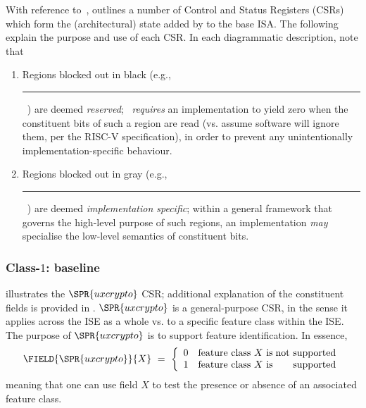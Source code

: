 
With reference to~\cite[Chapter 2]{SCARV:RV:ISA:II},
outlines a number of Control and Status Registers (CSRs) which form the
(architectural) state added by \XCRYPTO to the base ISA.  The following 
\SEC[s] explain the purpose and use of each CSR.
In each diagrammatic description, note that 

\begin{enumerate}
\item Regions blocked out in black 
      (e.g.,~{\color{black}    \rule{3em}{2ex}}~)
      are deemed 
      {\em reserved};
      \XCRYPTO~{\em requires} an implementation to yield zero when the
      constituent bits of such a region are read 
      (vs. assume software will ignore them, per the RISC-V specification),
      in order to prevent any unintentionally implementation-specific 
      behaviour.

\item Regions blocked out in gray  
      (e.g.,~{\color{lightgray}\rule{3em}{2ex}}~)
      are deemed
      {\em implementation specific};
      within a general framework that governs the high-level purpose of 
      such regions, an implementation {\em may} specialise the low-level 
      semantics of constituent bits.
\end{enumerate}


\subsubsection{Class-$1$:   baseline}
\label{sec:spec:state:1}

illustrates the 
$\SPR{uxcrypto}$
CSR; additional explanation of the constituent fields is provided in
.
$\SPR{uxcrypto}$
is a general-purpose CSR, in the sense it applies 
across the ISE as a whole 
vs.
to a specific feature class within the ISE.
The purpose of 
$\SPR{uxcrypto}$
is to support feature identification.  
In essence, 
\[
\FIELD{\SPR{uxcrypto}}{X} ~=~ \left\{\begin{array}{ll@{\;}r}
                                     0 & \mbox{feature class $X$ is} & \mbox{not supported} \\
                                     1 & \mbox{feature class $X$ is} & \mbox{    supported} \\
                                     \end{array}
                              \right.
\]
meaning that one can use field $X$ to test the presence or absence of
an associated feature class.

